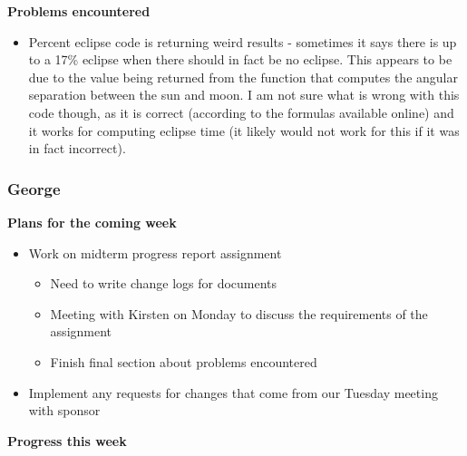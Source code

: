 \documentclass[10pt, onecolumn, draftclsnofoot, letterpaper, compsoc]{IEEEtran}
\begin{document}
    \noindent \textbf{Problems encountered}

    \begin{itemize}

    \item Percent eclipse code is returning weird results - sometimes it says there is up to a 17\% eclipse
      when there should in fact be no eclipse. This appears to be due to the value being returned from
      the function that computes the angular separation between the sun and moon. I am not sure what is wrong
      with this code though, as it is correct (according to the formulas available online) and it works for
      computing eclipse time (it likely would not work for this if it was in fact incorrect).

    \end{itemize}

    \subsubsection{George}

    \noindent \textbf{Plans for the coming week}

    \begin{itemize}

    \item Work on midterm progress report assignment

    \begin{itemize}
      \item Need to write change logs for documents
      \item Meeting with Kirsten on Monday to discuss the requirements of the assignment
      \item Finish final section about problems encountered
    \end{itemize}

    \item Implement any requests for changes that come from our Tuesday meeting with sponsor

    \end{itemize}

    \noindent \textbf{Progress this week}
\end{document}
